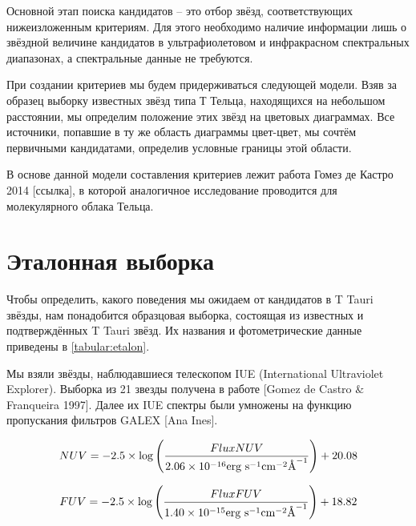 Основной этап поиска кандидатов -- это отбор звёзд, соответствующих нижеизложенным критериям. Для этого необходимо наличие информации лишь о звёздной величине кандидатов в ультрафиолетовом и инфракрасном спектральных диапазонах, а спектральные данные не требуются.

При создании критериев мы будем придерживаться следующей модели. Взяв за образец выборку известных звёзд типа Т Тельца, находящихся на небольшом расстоянии, мы определим положение этих звёзд на цветовых диаграммах. Все источники, попавшие в ту же область диаграммы цвет-цвет, мы сочтём первичными кандидатами, определив условные границы этой области.

В основе данной модели составления критериев лежит работа Гомез де Кастро 2014 [ссылка], в которой аналогичное исследование проводится для молекулярного облака Тельца.

\section{Эталонная выборка}
Чтобы определить, какого поведения мы ожидаем от кандидатов в T Tauri звёзды, нам понадобится образцовая выборка, состоящая из известных и подтверждённых T Tauri звёзд. Их названия и фотометрические данные приведены в \ref{tabular:etalon}.

Мы взяли звёзды, наблюдавшиеся телескопом IUE (International Ultraviolet Explorer). Выборка из 21 звезды получена в работе [Gomez de Castro $\&$ Franqueira 1997]. Далее их IUE спектры были умножены на функцию пропускания фильтров GALEX [Ana Ines]. 

$$NUV = -2.5\times\log\left(\frac{FluxNUV}{2.06\times10^{-16}\text{erg }\text{s}^{-1}\text{cm}^{-2}\text{\normalfont\AA}^{-1}}\right) + 20.08$$

$$FUV = -2.5\times\log\left(\frac{FluxFUV}{1.40\times10^{-15}\text{erg }\text{s}^{-1}\text{cm}^{-2}\text{\normalfont\AA}^{-1}}\right) + 18.82$$
\vspace{1em}

